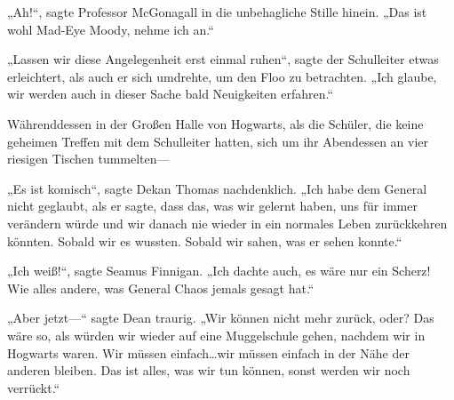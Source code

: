 „Ah!“, sagte Professor McGonagall in die unbehagliche Stille hinein. „Das ist wohl Mad-Eye Moody, nehme ich an.“

„Lassen wir diese Angelegenheit erst einmal ruhen“, sagte der Schulleiter etwas erleichtert, als auch er sich umdrehte, um den Floo zu betrachten. „Ich glaube, wir werden auch in dieser Sache bald Neuigkeiten erfahren.“


Währenddessen in der Großen Halle von Hogwarts, als die Schüler, die keine geheimen Treffen mit dem Schulleiter hatten, sich um ihr Abendessen an vier riesigen Tischen tummelten—

„Es ist komisch“, sagte Dekan Thomas nachdenklich. „Ich habe dem General nicht geglaubt, als er sagte, dass das, was wir gelernt haben, uns für immer verändern würde und wir danach nie wieder in ein normales Leben zurückkehren könnten. Sobald wir es wussten. Sobald wir sahen, was er sehen konnte.“

„Ich weiß!“, sagte Seamus Finnigan. „Ich dachte auch, es wäre nur ein Scherz! Wie alles andere, was General Chaos jemals gesagt hat.“

„Aber jetzt—“ sagte Dean traurig. „Wir können nicht mehr zurück, oder? Das wäre so, als würden wir wieder auf eine Muggelschule gehen, nachdem wir in Hogwarts waren. Wir müssen einfach…wir müssen einfach in der Nähe der anderen bleiben. Das ist alles, was wir tun können, sonst werden wir noch verrückt.“

